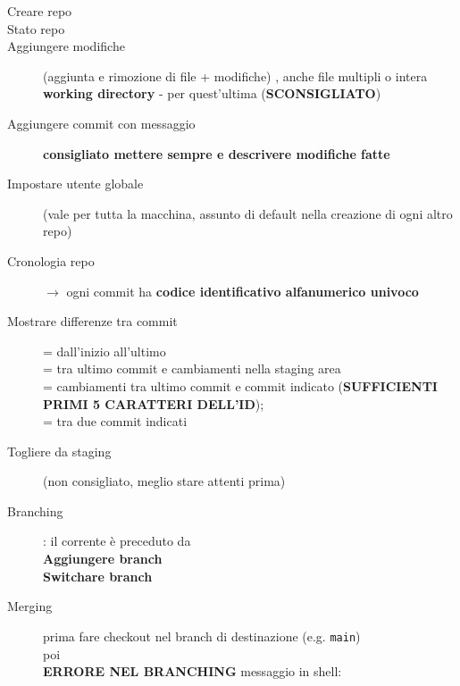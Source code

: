 \documentclass[10pt, oneside]{Book}
\begin{document}
\begin{description}
\item[Creare repo] 
\item[Stato repo] 
\item[Aggiungere modifiche] (aggiunta e rimozione di file + modifiche) , anche file multipli o intera \textbf{working directory} - per quest'ultima  (\textbf{SCONSIGLIATO})
\item[Aggiungere commit con messaggio] \textbf{consigliato mettere sempre e descrivere modifiche fatte}
\item[Impostare utente globale]   (vale per tutta la macchina, assunto di default nella creazione di ogni altro repo)
\item[Cronologia repo]  $\rightarrow$ ogni commit ha \textbf{codice identificativo alfanumerico univoco}
\item[Mostrare differenze tra commit]  = dall'inizio all'ultimo
\\ = tra ultimo commit e cambiamenti nella staging area
\\ = cambiamenti tra ultimo commit e commit indicato (\textbf{SUFFICIENTI PRIMI 5 CARATTERI DELL'ID}); 
\\ = tra due commit indicati
\item[Togliere da staging]  (non consigliato, meglio stare attenti prima)
\item[Branching]  : il corrente è preceduto da \boxed{\texttt{\*}}
\\\textbf{Aggiungere branch} 
\\\textbf{Switchare branch} 
\item[Merging]  prima fare checkout nel branch di destinazione (e.g. \texttt{main})
\\ poi 
\\\textbf{ERRORE NEL BRANCHING} messaggio in shell:
\\

\end{description}
\end{document}
